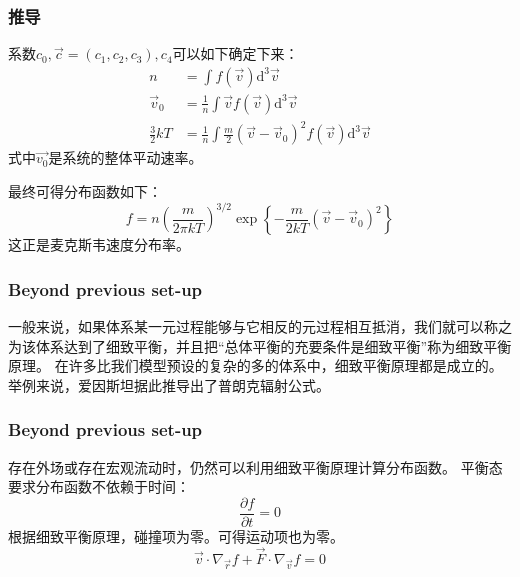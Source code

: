 \documentclass{if-beamer}
\begin{document}
\begin{frame}
    \frametitle{推导}
        \begin{block}{}
            系数$c_0,\vec{c}=(c_1,c_2,c_3),c_4$可以如下确定下来：
            \begin{equation*}
                \begin{aligned}
                n&=\int f(\vec{v}) \mathrm{d}^{3} \vec{v}\\ 
                \vec{v}_{0}&=\frac{1}{n} \int \vec{v} f(\vec{v}) \mathrm{d}^{3} \vec{v}\\ 
                \frac{3}{2} k T&=\frac{1}{n} \int \frac{m}{2}\left(\vec{v}-\vec{v}_{0}\right)^{2} f(\vec{v}) \mathrm{d}^{3} \vec{v}
                \end{aligned}
            \end{equation*}
        式中$\vec{v_0}$是系统的整体平动速率。
        \end{block}
        \begin{block}{}
        最终可得分布函数如下：
        \begin{equation*}
            f=n\left(\frac{m}{2 \pi k T}\right)^{3 / 2} \exp \left\{-\frac{m}{2 k T}\left(\vec{v}-\vec{v}_{0}\right)^{2}\right\}
        \end{equation*}
        这正是麦克斯韦速度分布率。
        \end{block}
    

\end{frame}
\begin{frame}
    \frametitle{Beyond previous set-up}
一般来说，如果体系某一元过程能够与它相反的元过程相互抵消，我们就可以称之为该体系达到了细致平衡，并且把“总体平衡的充要条件是细致平衡”称为细致平衡原理。
在许多比我们模型预设的复杂的多的体系中，细致平衡原理都是成立的。举例来说，爱因斯坦据此推导出了普朗克辐射公式。
    

\end{frame}
\begin{frame}
    \frametitle{Beyond previous set-up}
    \begin{block}
        {存在外场或存在宏观流动时，仍然可以利用细致平衡原理计算分布函数。}
            平衡态要求分布函数不依赖于时间：
            \begin{equation*}
                \frac{\partial f}{\partial{t}}=0
            \end{equation*}
            根据细致平衡原理，碰撞项为零。可得运动项也为零。
            \begin{equation*}
                \vec{v}\cdot\nabla_{\vec{r}}{f}+\vec{F}\cdot\nabla_{\vec{v}}{f}=0
            \end{equation*}
    \end{block}


\end{frame}
    
\end{document}
